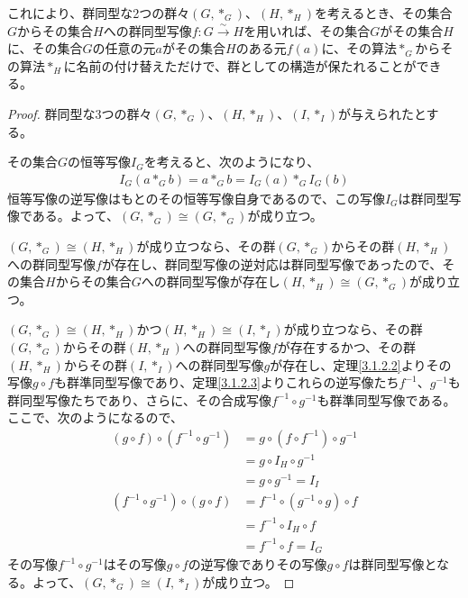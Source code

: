 \documentclass[dvipdfmx]{jsarticle}
\begin{document}
これにより、群同型な2つの群々$\left( G,*_{G} \right)$、$\left( H,*_{H} \right)$を考えるとき、その集合$G$からその集合$H$への群同型写像$f:G\overset{\sim}{\rightarrow}H$を用いれば、その集合$G$がその集合$H$に、その集合$G$の任意の元$a$がその集合$H$のある元$f(a)$に、その算法$*_{G}$からその算法$*_{H}$に名前の付け替えただけで、群としての構造が保たれることができる。
\begin{proof}
群同型な3つの群々$\left( G,*_{G} \right)$、$\left( H,*_{H} \right)$、$\left( I,*_{I} \right)$が与えられたとする。\par
その集合$G$の恒等写像$I_{G}$を考えると、次のようになり、
\begin{align*}
I_{G}\left( a*_{G}b \right) = a*_{G}b = I_{G}(a)*_{G}I_{G}(b)
\end{align*}
恒等写像の逆写像はもとのその恒等写像自身であるので、この写像$I_{G}$は群同型写像である。よって、$\left( G,*_{G} \right) \cong \left( G,*_{G} \right)$が成り立つ。\par
$\left( G,*_{G} \right) \cong \left( H,*_{H} \right)$が成り立つなら、その群$\left( G,*_{G} \right)$からその群$\left( H,*_{H} \right)$への群同型写像$f$が存在し、群同型写像の逆対応は群同型写像であったので、その集合$H$からその集合$G$への群同型写像が存在し$\left( H,*_{H} \right) \cong \left( G,*_{G} \right)$が成り立つ。\par
$\left( G,*_{G} \right) \cong \left( H,*_{H} \right)$かつ$\left( H,*_{H} \right) \cong \left( I,*_{I} \right)$が成り立つなら、その群$\left( G,*_{G} \right)$からその群$\left( H,*_{H} \right)$への群同型写像$f$が存在するかつ、その群$\left( H,*_{H} \right)$からその群$\left( I,*_{I} \right)$への群同型写像$g$が存在し、定理\ref{3.1.2.2}よりその写像$g \circ f$も群準同型写像であり、定理\ref{3.1.2.3}よりこれらの逆写像たち$f^{- 1}$、$g^{- 1}$も群同型写像たちであり、さらに、その合成写像$f^{- 1} \circ g^{- 1}$も群準同型写像である。ここで、次のようになるので、
\begin{align*}
(g \circ f) \circ \left( f^{- 1} \circ g^{- 1} \right) &= g \circ \left( f \circ f^{- 1} \right) \circ g^{- 1}\\
&= g \circ I_{H} \circ g^{- 1}\\
&= g \circ g^{- 1} = I_{I}\\
\left( f^{- 1} \circ g^{- 1} \right) \circ (g \circ f) &= f^{- 1} \circ \left( g^{- 1} \circ g \right) \circ f\\
&= f^{- 1} \circ I_{H} \circ f\\
&= f^{- 1} \circ f = I_{G}
\end{align*}
その写像$f^{- 1} \circ g^{- 1}$はその写像$g \circ f$の逆写像でありその写像$g \circ f$は群同型写像となる。よって、$\left( G,*_{G} \right) \cong \left( I,*_{I} \right)$が成り立つ。
\end{proof}
\end{document}
